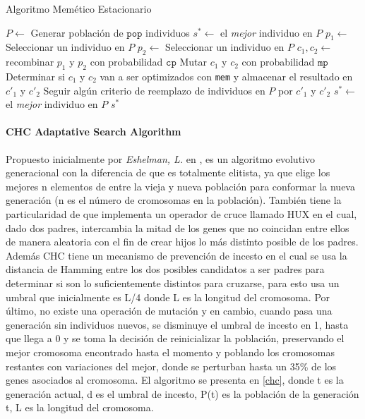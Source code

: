 \begin{algorithm}
\caption{Algoritmo Memético Estacionario}
\label{ssma}
\begin{algorithmic}[1]


\State $P \gets$ Generar población de $\texttt{pop}$ individuos
\State $s^* \gets $ el \emph{mejor} individuo en $P$
	\State $p_1 \gets$ Seleccionar un individuo en $P$
	\State $p_2 \gets$ Seleccionar un individuo en $P$
	\State $c_1, c_2 \gets $ recombinar $p_1$ y $p_2$ con probabilidad $\texttt{cp}$
	\State Mutar $c_1$ y $c_2$ con probabilidad $\texttt{mp}$
	\State Determinar si $c_1$ y $c_2$ van a ser optimizados con \texttt{mem} y almacenar el resultado en $c'_1$ y $c'_2$
	\State Seguir algún criterio de reemplazo de individuos en $P$ por $c'_1$ y $c'_2$
		\State $s^* \gets$ el \emph{mejor} individuo en $P$
	\EndIf
\EndWhile
\State \Return $s^*$

\end{algorithmic}
\end{algorithm}

\paragraph{CHC Adaptative Search Algorithm}

Propuesto inicialmente por \emph{Eshelman, L.} en \cite{eshelman1991chc}, es un algoritmo evolutivo generacional con la diferencia de que es totalmente elitista, ya que elige los mejores n elementos de entre la vieja y nueva población para conformar la nueva generación (n es el número de cromosomas en la población). También tiene la particularidad de que implementa un operador de cruce llamado HUX en el cual, dado dos padres, intercambia la mitad de los genes que no coincidan entre ellos de manera aleatoria con el fin de crear hijos lo más distinto posible de los padres. Además CHC tiene un mecanismo de prevención de incesto en el cual se usa la distancia de Hamming entre los dos posibles candidatos a ser padres para determinar si son lo suficientemente distintos para cruzarse, para esto usa un umbral que inicialmente es L/4 donde L es la longitud del cromosoma. Por último, no existe una operación de mutación y en cambio, cuando pasa una generación sin individuos nuevos, se disminuye el umbral de incesto en 1, hasta que llega a 0 y se toma la decisión de reinicializar la población, preservando el mejor cromosoma encontrado hasta el momento y poblando los cromosomas restantes con variaciones del mejor, donde se perturban hasta un 35\% de los genes asociados al cromosoma. El algoritmo se presenta en \ref{chc}, donde t es la generación actual, d es el umbral de incesto, P(t) es la población de la generación t, L es la longitud del cromosoma.

